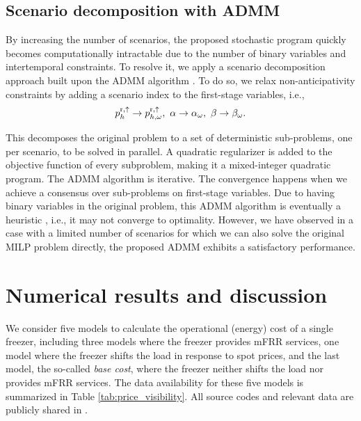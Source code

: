 \documentclass[11pt,a4paper]{article}
\begin{document}
\subsection{Scenario decomposition with ADMM}\label{sec:admm}
By increasing the number of scenarios,  the proposed stochastic program  quickly becomes computationally intractable due to the number of binary variables and intertemporal constraints. To resolve it, we apply a scenario decomposition approach built upon the ADMM algorithm \cite{boyd2011distributed}. To do so, we relax non-anticipativity constraints by adding a scenario index to the first-stage variables, i.e.,
%
\begin{equation}\label{eq:non_anticipativity}
    p_{h}^{\rm{r},\uparrow} \rightarrow p^{\rm{r},\uparrow}_{h,\omega}, \ \alpha \rightarrow \alpha_{\omega}, \ \beta \rightarrow \beta_{\omega}.
\end{equation}

This decomposes the original problem to a set of deterministic sub-problems, one per scenario, to be solved in parallel. A quadratic regularizer is added to the objective function of every subproblem, making it a mixed-integer quadratic program.
The ADMM algorithm is iterative. The convergence happens when we achieve a consensus over sub-problems on first-stage  variables. Due to having binary variables in the original problem, this ADMM algorithm is eventually a heuristic \cite{hong2016convergence}, i.e., it may not converge to optimality. However, we have observed in a case with a limited number of scenarios for which we can also solve the original MILP problem directly, the proposed ADMM exhibits a satisfactory performance.


\section{Numerical results and discussion}\label{sec:results}

We consider five models to calculate the operational (energy) cost of a single freezer, including three models where the freezer provides mFRR services, one model where the freezer shifts the load in response to spot prices, and the last model, the so-called \textit{base cost}, where the freezer neither shifts the load nor provides mFRR services. The data availability for these five models is summarized in
Table \ref{tab:price_visibility}. All source codes and relevant data are publicly shared in \cite{code}.
\end{document}
